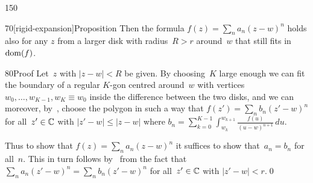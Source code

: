 \begin{parsec}{150}
\begin{point}{70}[rigid-expansion]{Proposition}
Then the formula $f(z)=\sum_n a_n (z-w)^n$
holds also for any $z$ from a larger disk 
with radius~$R>r$
around~$w$ that still fits in~$\operatorname{dom}(f)$.
\begin{point}{80}{Proof}%
Let~$z$ with $\left|z-w\right|<R$ be given.
By choosing~$K$ large enough
we can fit the boundary of a regular $K$-gon
centred around~$w$
with vertices $w_0,\dotsc,w_{K-1},w_{K}\equiv w_0$
inside the difference between the two disks,
and we can moreover, by~,
choose the polygon
in such a way that
$f(z')=\sum_n b_n (z'-w)^n$
for all~$z'\in\mathbb{C}$
with $\left|z'-w\right|\leq \left|z-w\right|$
where $b_n = \sum_{k=0}^{K-1}
\int_{w_k}^{w_{k+1}}
\frac{f(u)}{(u-w)^{n+1}}\,du$.

Thus to show that $f(z)=\sum_n a_n (z-w)^n$
it suffices to show that~$a_n=b_n$ for all~$n$.
This in turn
follows by~ from the fact
that $\sum_n a_n (z'-w)^n
= \sum_n b_n (z'-w)^n$
for all~$z'\in \mathbb{C}$ with $\left|z'-w\right|<r$.\qed
\end{point}
\end{point}
\end{parsec}
